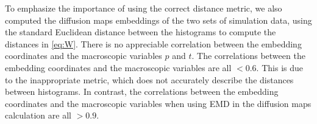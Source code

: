 \documentclass[prl, reprint, final, showkeys]{revtex4-1}
\begin{document}

To emphasize the importance of using the correct distance metric, we also computed the diffusion maps embeddings of the two sets of simulation data, using the standard Euclidean distance between the histograms to compute the distances in \eqref{eq:W}.
%
There is no appreciable correlation between the embedding coordinates and the macroscopic variables $p$ and $t$. 
%
The correlations between the embedding coordinates and the macroscopic variables are all $< 0.6$.
%
This is due to the inappropriate metric, which does not accurately describe the distances between histograms.
%
In contrast, the correlations between the embedding coordinates and the macroscopic variables when using EMD in the diffusion maps calculation are all $> 0.9$.


%
%
%
%

%
%
\end{document}
